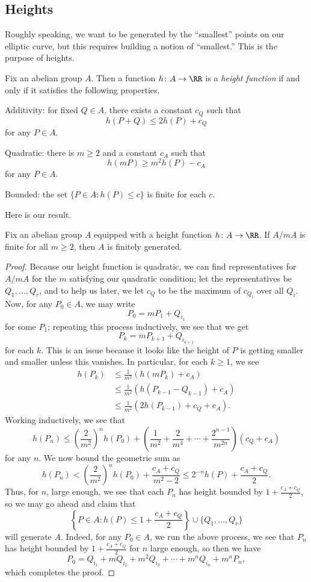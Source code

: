 \documentclass[../notes.tex]{subfiles}
\begin{document}
\subsection{Heights}
Roughly speaking, we want to be generated by the ``smallest'' points on our elliptic curve, but this requires building a notion of ``smallest.'' This is the purpose of heights.
\begin{definition}[height] \label{def:height}
	Fix an abelian group $A$. Then a function $h\colon A\to\RR$ is a \textit{height function} if and only if it satisfies the following properties.
	\begin{listalph}
		\item Additivity: for fixed $Q\in A$, there exists a constant $c_Q$ such that
		\[h(P+Q)\le 2h(P)+c_Q\]
		for any $P\in A$.
		\item Quadratic: there is $m\ge2$ and a constant $c_A$ such that
		\[h(mP)\ge m^2h(P)-c_A\]
		for any $P\in A$.
		\item Bounded: the set $\{P\in A:h(P)\le c\}$ is finite for each $c$.
	\end{listalph}
\end{definition}
Here is our result.
\begin{proposition}
	Fix an abelian group $A$ equipped with a height function $h\colon A\to\RR$. If $A/mA$ is finite for all $m\ge2$, then $A$ is finitely generated.
\end{proposition}
\begin{proof}
	Because our height function is quadratic, we can find representatives for $A/mA$ for the $m$ satisfying our quadratic condition; let the representatives be $Q_1,\ldots,Q_r$, and to help us later, we let $c_Q$ to be the maximum of $c_{Q_i}$ over all $Q_i$. Now, for any $P_0\in A$, we may write
	\[P_0=mP_1+Q_{i_1}\]
	for some $P_1$; repeating this process inductively, we see that we get
	\[P_k=mP_{k+1}+Q_{i_{k+1}}\]
	for each $k$. This is an issue because it looks like the height of $P$ is getting smaller and smaller unless this vanishes. In particular, for each $k\ge1$, we see
	\begin{align*}
		h(P_k) &\le \frac1{m^2}\left(h(mP_k)+c_A\right) \\
		&\le \frac1{m^2}\left(h(P_{k-1}-Q_{k-1})+c_A\right) \\
		&\le \frac1{m^2}\left(2h(P_{k-1})+c_Q+c_A\right).
	\end{align*}
	Working inductively, we see that
	\[h(P_n)\le\left(\frac2{m^2}\right)^nh(P_0)+\left(\frac1{m^2}+\frac2{m^4}+\cdots+\frac{2^{n-1}}{m^{2n}}\right)(c_Q+c_A)\]
	for any $n$. We now bound the geometric sum as
	\[h(P_n)<\left(\frac2{m^2}\right)^nh(P_0)+\frac{c_A+c_Q}{m^2-2}\le2^{-n}h(P)+\frac{c_A+c_Q}2.\]
	Thus, for $n$, large enough, we see that each $P_n$ has height bounded by $1+\frac{c_A+c_Q}2$, so we may go ahead and claim that
	\[\left\{P\in A:h(P)\le1+\frac{c_A+c_Q}2\right\}\cup\{Q_1,\ldots,Q_r\}\]
	will generate $A$. Indeed, for any $P_0\in A$, we run the above process, we see that $P_n$ has height bounded by $1+\frac{c_A+c_Q}2$ for $n$ large enough, so then we have
	\[P_0=Q_{i_1}+mQ_{i_2}+m^2Q_{i_3}+\cdots+m^nQ_{i_n}+m^nP_n,\]
	which completes the proof.
\end{proof}
\end{document}
